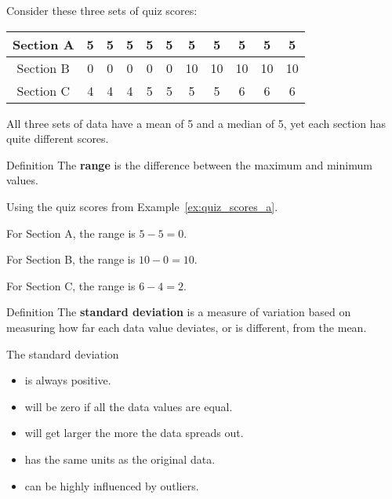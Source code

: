\documentclass{beamer}
\begin{document}
\begin{frame}
\begin{example}\label{ex:quiz_scores_a}
Consider these three sets of quiz scores:
\begin{center}
\begin{tabular}{|c|cccccccccc|}
\hline
Section A & 5 & 5 & 5 & 5 & 5 & 5 & 5 & 5 & 5 & 5 \\ \hline
Section B & 0 & 0 & 0 & 0 & 0 & 10 & 10 & 10 & 10 & 10 \\ \hline
Section C & 4 & 4 & 4 & 5 & 5 & 5 & 5 & 6 & 6 & 6 \\ \hline
\end{tabular}
\end{center}\pause
All three sets of data have a mean of 5 and a median of 5, yet each section has quite different scores.
\end{example}\pause

\begin{block}{Definition}
The \textbf{range} is the difference between the maximum and minimum values.
\end{block}\pause

\begin{example}
Using the quiz scores from Example~\ref{ex:quiz_scores_a}.

For Section A, the range is $5-5=0$. \pause

For Section B, the range is $10-0=10$.  \pause

For Section C, the range is $6-4=2$. 
\end{example}
\end{frame}

\begin{frame}
\begin{block}{Definition}
The \textbf{standard deviation} is a measure of variation based on measuring how far each data value deviates, or is different, from the mean.

\vspace{2mm}
The standard deviation 
\begin{itemize}[<+- | alert@+>]
\item is always positive. 
\item will be zero if all the data values are equal.
\item will get larger the more the data spreads out.
\item has the same units as the original data.
\item can be highly influenced by outliers.
\end{itemize}
\end{block}
\end{frame}
\end{document}
